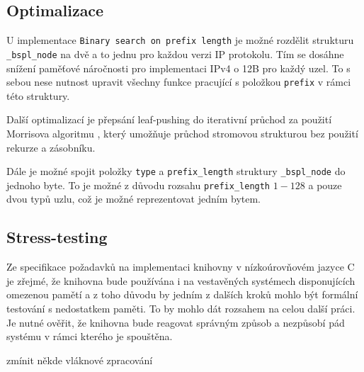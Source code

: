 \subsection{Optimalizace}
U implementace \texttt{Binary search on prefix length} je možné rozdělit strukturu \texttt{\_bspl\_node}
na dvě a to jednu pro každou verzi IP protokolu. Tím se dosáhne snížení paměťové náročnosti
pro implementaci IPv4 o 12B pro každý uzel. To s sebou nese nutnost upravit všechny funkce pracující
s položkou \texttt{prefix} v rámci této struktury.

Další optimalizací je přepsání leaf-pushing do iterativní průchod za použití Morrisova algoritmu \cite{morris},
který umožňuje průchod stromovou strukturou bez použití rekurze a zásobníku.

Dále je možné spojit položky \texttt{type} a \texttt{prefix\_length} struktury \texttt{\_bspl\_node}
do jednoho byte. To je možné z důvodu rozsahu \texttt{prefix\_length} $1-128$ a pouze dvou typů uzlu,
což je možné reprezentovat jedním bytem.

\subsection{Stress-testing}
Ze specifikace požadavků na implementaci knihovny v nízkoúrovňovém jazyce C je zřejmé,
že knihovna bude používána i na vestavěných systémech disponujících omezenou pamětí a z toho
důvodu by jedním z dalších kroků mohlo být formální testování s nedostatkem paměti.
To by mohlo dát rozsahem na celou další práci. Je nutné ověřit, že knihovna bude
reagovat správným způsob a nezpůsobí pád systému v rámci kterého je spouštěna.

zmínit někde vláknové zpracování
